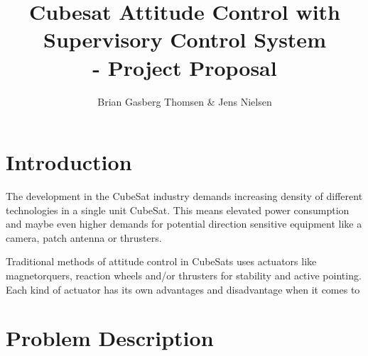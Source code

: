 \documentclass[10pt,a4paper,oneside,openany,article]{memoir}
\title{\vspace{-2cm} Cubesat Attitude Control with Supervisory Control System \\ \Large - Project Proposal}
\author{Brian Gasberg Thomsen \& Jens Nielsen}
\begin{document}
\maketitle

\chapter{Introduction}
The development in the CubeSat industry demands increasing density of different technologies in a single unit CubeSat. This means elevated power consumption and maybe even higher demands for potential direction sensitive equipment like a camera, patch antenna or thrusters. 

Traditional methods of attitude control in CubeSats uses actuators like magnetorquers, reaction wheels and/or thrusters for stability and active pointing. Each kind of actuator has its own advantages and disadvantage when it comes to 

\chapter{Problem Description}

\end{document}
